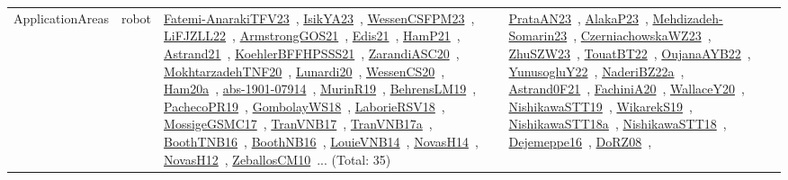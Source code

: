 {\begin{longtable}{lp{3cm}>{\raggedright\arraybackslash}p{6cm}>{\raggedright\arraybackslash}p{6cm}>{\raggedright\arraybackslash}p{8cm}}
\index{robot}\index{ApplicationAreas!robot}ApplicationAreas & robot & \href{../works/Fatemi-AnarakiTFV23.pdf}{Fatemi-AnarakiTFV23}~\cite{Fatemi-AnarakiTFV23}, \href{../works/IsikYA23.pdf}{IsikYA23}~\cite{IsikYA23}, \href{../works/WessenCSFPM23.pdf}{WessenCSFPM23}~\cite{WessenCSFPM23}, \href{../works/LiFJZLL22.pdf}{LiFJZLL22}~\cite{LiFJZLL22}, \href{../works/ArmstrongGOS21.pdf}{ArmstrongGOS21}~\cite{ArmstrongGOS21}, \href{../works/Edis21.pdf}{Edis21}~\cite{Edis21}, \href{../works/HamP21.pdf}{HamP21}~\cite{HamP21}, \href{../works/Astrand21.pdf}{Astrand21}~\cite{Astrand21}, \href{../works/KoehlerBFFHPSSS21.pdf}{KoehlerBFFHPSSS21}~\cite{KoehlerBFFHPSSS21}, \href{../works/ZarandiASC20.pdf}{ZarandiASC20}~\cite{ZarandiASC20}, \href{../works/MokhtarzadehTNF20.pdf}{MokhtarzadehTNF20}~\cite{MokhtarzadehTNF20}, \href{../works/Lunardi20.pdf}{Lunardi20}~\cite{Lunardi20}, \href{../works/WessenCS20.pdf}{WessenCS20}~\cite{WessenCS20}, \href{../works/Ham20a.pdf}{Ham20a}~\cite{Ham20a}, \href{../works/abs-1901-07914.pdf}{abs-1901-07914}~\cite{abs-1901-07914}, \href{../works/MurinR19.pdf}{MurinR19}~\cite{MurinR19}, \href{../works/BehrensLM19.pdf}{BehrensLM19}~\cite{BehrensLM19}, \href{../works/PachecoPR19.pdf}{PachecoPR19}~\cite{PachecoPR19}, \href{../works/GombolayWS18.pdf}{GombolayWS18}~\cite{GombolayWS18}, \href{../works/LaborieRSV18.pdf}{LaborieRSV18}~\cite{LaborieRSV18}, \href{../works/MossigeGSMC17.pdf}{MossigeGSMC17}~\cite{MossigeGSMC17}, \href{../works/TranVNB17.pdf}{TranVNB17}~\cite{TranVNB17}, \href{../works/TranVNB17a.pdf}{TranVNB17a}~\cite{TranVNB17a}, \href{../works/BoothTNB16.pdf}{BoothTNB16}~\cite{BoothTNB16}, \href{../works/BoothNB16.pdf}{BoothNB16}~\cite{BoothNB16}, \href{../works/LouieVNB14.pdf}{LouieVNB14}~\cite{LouieVNB14}, \href{../works/NovasH14.pdf}{NovasH14}~\cite{NovasH14}, \href{../works/NovasH12.pdf}{NovasH12}~\cite{NovasH12}, \href{../works/ZeballosCM10.pdf}{ZeballosCM10}~\cite{ZeballosCM10}... (Total: 35) & \href{../works/PrataAN23.pdf}{PrataAN23}~\cite{PrataAN23}, \href{../works/AlakaP23.pdf}{AlakaP23}~\cite{AlakaP23}, \href{../works/Mehdizadeh-Somarin23.pdf}{Mehdizadeh-Somarin23}~\cite{Mehdizadeh-Somarin23}, \href{../works/CzerniachowskaWZ23.pdf}{CzerniachowskaWZ23}~\cite{CzerniachowskaWZ23}, \href{../works/ZhuSZW23.pdf}{ZhuSZW23}~\cite{ZhuSZW23}, \href{../works/TouatBT22.pdf}{TouatBT22}~\cite{TouatBT22}, \href{../works/OujanaAYB22.pdf}{OujanaAYB22}~\cite{OujanaAYB22}, \href{../works/YunusogluY22.pdf}{YunusogluY22}~\cite{YunusogluY22}, \href{../works/NaderiBZ22a.pdf}{NaderiBZ22a}~\cite{NaderiBZ22a}, \href{../works/Astrand0F21.pdf}{Astrand0F21}~\cite{Astrand0F21}, \href{../works/FachiniA20.pdf}{FachiniA20}~\cite{FachiniA20}, \href{../works/WallaceY20.pdf}{WallaceY20}~\cite{WallaceY20}, \href{../works/NishikawaSTT19.pdf}{NishikawaSTT19}~\cite{NishikawaSTT19}, \href{../works/WikarekS19.pdf}{WikarekS19}~\cite{WikarekS19}, \href{../works/NishikawaSTT18a.pdf}{NishikawaSTT18a}~\cite{NishikawaSTT18a}, \href{../works/NishikawaSTT18.pdf}{NishikawaSTT18}~\cite{NishikawaSTT18}, \href{../works/Dejemeppe16.pdf}{Dejemeppe16}~\cite{Dejemeppe16}, \href{../works/DoRZ08.pdf}{DoRZ08}~\cite{DoRZ08}, 
\end{longtable}}
